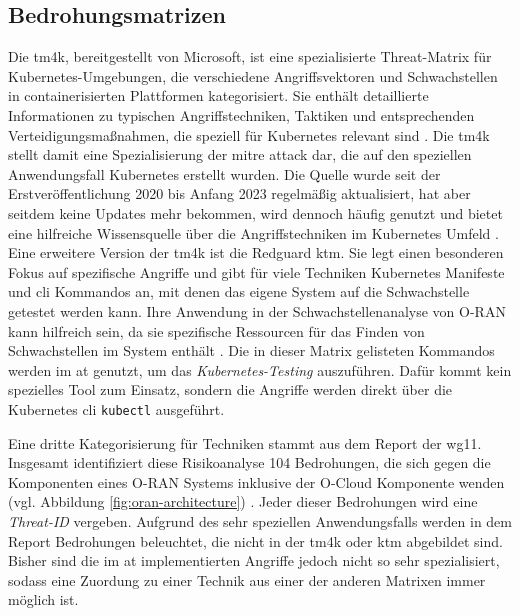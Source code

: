 \subsection{Bedrohungsmatrizen}
\par Die \gls{tm4k}, bereitgestellt von Microsoft, ist eine spezialisierte Threat-Matrix für Kubernetes-Umgebungen, die verschiedene Angriffsvektoren und Schwachstellen in containerisierten Plattformen kategorisiert. Sie enthält detaillierte Informationen zu typischen Angriffstechniken, Taktiken und entsprechenden Verteidigungsmaßnahmen, die speziell für Kubernetes relevant sind \autocite{TacticsThreatMatrix}. Die \gls{tm4k} stellt damit eine Spezialisierung der \gls{mitre} \gls{attack} dar, die auf den speziellen Anwendungsfall Kubernetes erstellt wurden. Die Quelle wurde seit der Erstveröffentlichung 2020 bis Anfang 2023 regelmäßig aktualisiert, hat aber seitdem keine Updates mehr bekommen, wird dennoch häufig genutzt und bietet eine hilfreiche Wissensquelle über die Angriffstechniken im Kubernetes Umfeld \autocite{DeploymentsMicrosoftThreatMatrixforKubernetes}. Eine erweitere Version der \gls{tm4k} ist die Redguard \gls{ktm}. Sie legt einen besonderen Fokus auf spezifische Angriffe und gibt für viele Techniken Kubernetes Manifeste und \gls{cli} Kommandos an, mit denen das eigene System auf die Schwachstelle getestet werden kann. Ihre Anwendung in der Schwachstellenanalyse von O-RAN kann hilfreich sein, da sie spezifische Ressourcen für das Finden von Schwachstellen im System enthält \autocite{KubernetesThreatMatrix}. Die in dieser Matrix gelisteten Kommandos werden im \gls{at} genutzt, um das \textit{Kubernetes-Testing} auszuführen. Dafür kommt kein spezielles Tool zum Einsatz, sondern die Angriffe werden direkt über die Kubernetes \gls{cli} \verb|kubectl| ausgeführt.
\par Eine dritte Kategorisierung für Techniken stammt aus dem Report der \orana{} \gls{wg11}. Insgesamt identifiziert diese Risikoanalyse 104 Bedrohungen, die sich gegen die Komponenten eines O-RAN Systems inklusive der O-Cloud Komponente wenden (vgl. Abbildung \ref{fig:oran-architecture}) \autocite{o-ranworkgroup11securityworkgroupORANSecurityThreat2024}. Jeder dieser Bedrohungen wird eine \textit{Threat-ID} vergeben. Aufgrund des sehr speziellen Anwendungsfalls werden in dem Report Bedrohungen beleuchtet, die nicht in der \gls{tm4k} oder \gls{ktm} abgebildet sind. Bisher sind die im \gls{at} implementierten Angriffe jedoch nicht so sehr spezialisiert, sodass eine Zuordung zu einer Technik aus einer der anderen Matrixen immer möglich ist.
